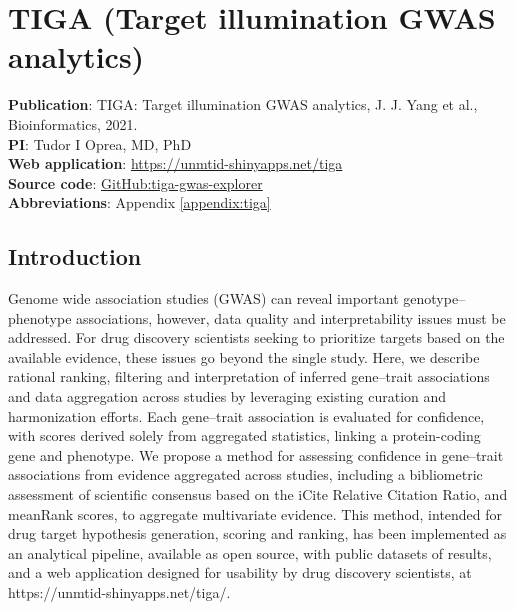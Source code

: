 \chapter{TIGA (Target illumination GWAS analytics)}

\textbf{Publication}: TIGA: Target illumination GWAS analytics, J. J. Yang et al., Bioinformatics, 2021\cite{Yang2021-di}.\\
\textbf{PI}: Tudor I Oprea, MD, PhD\\
\textbf{Web application}: \href{https://unmtid-shinyapps.net/tiga}{https://unmtid-shinyapps.net/tiga}\\
\textbf{Source code}: \href{https://github.com/unmtransinfo/tiga-gwas-explorer}{GitHub:tiga-gwas-explorer}\\
\textbf{Abbreviations}: Appendix \ref{appendix:tiga}

\section{Introduction}

Genome wide association studies (GWAS) can reveal important genotype–phenotype associations, however, data quality and interpretability issues must be addressed. For drug discovery scientists seeking to prioritize targets based on the available evidence, these issues go beyond the single study. Here, we describe rational ranking, filtering and interpretation of inferred gene–trait associations and data aggregation across studies by leveraging existing curation and harmonization efforts. Each gene–trait association is evaluated for confidence, with scores derived solely from aggregated statistics, linking a protein-coding gene and phenotype. We propose a method for assessing confidence in gene–trait associations from evidence aggregated across studies, including a bibliometric assessment of scientific consensus based on the iCite Relative Citation Ratio, and meanRank scores, to aggregate multivariate evidence. This method, intended for drug target hypothesis generation, scoring and ranking, has been implemented as an analytical pipeline, available as open source, with public datasets of results, and a web application designed for usability by drug discovery scientists, at https://unmtid-shinyapps.net/tiga/\cite{Yang2021-di}.

